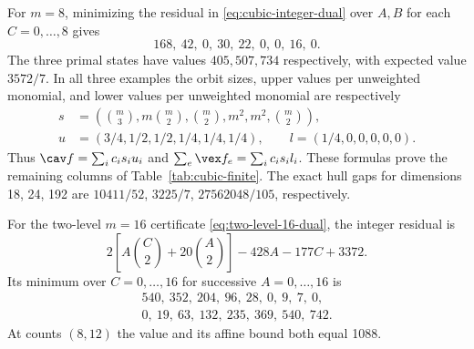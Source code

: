 For $m=8$, minimizing the residual in
\eqref{eq:cubic-integer-dual} over $A,B$ for each $C=0,\ldots,8$ gives
\[
 168,\ 42,\ 0,\ 30,\ 22,\ 0,\ 0,\ 16,\ 0.
\]
The three primal states have values $405,507,734$ respectively, with
expected value $3572/7$. In all three examples the orbit sizes, upper
values per unweighted monomial, and lower values per unweighted monomial
are respectively
\begin{align*}
 s&=\left(\binom m3,m\binom m2,\binom m2,m^2,m^2,\binom m2\right),\\
 u&=(3/4,1/2,1/2,1/4,1/4,1/4),\qquad
 l=(1/4,0,0,0,0,0).
\end{align*}
Thus $\cav f=\sum_ic_is_iu_i$ and $\sum_e\vex f_e=\sum_ic_is_il_i$.
These formulas prove the remaining columns of
Table~\ref{tab:cubic-finite}. The exact hull gaps for dimensions
18, 24, 192 are $10411/52$, $3225/7$, $27562048/105$, respectively.

For the two-level $m=16$ certificate
\eqref{eq:two-level-16-dual}, the integer residual is
\[
 2\left[A\binom C2+20\binom A2\right]-428A-177C+3372.
\]
Its minimum over $C=0,\ldots,16$ for successive $A=0,\ldots,16$ is
\[
\begin{gathered}
 540,\ 352,\ 204,\ 96,\ 28,\ 0,\ 9,\ 7,\ 0,\\
 0,\ 19,\ 63,\ 132,\ 235,\ 369,\ 540,\ 742.
\end{gathered}
\]
At counts $(8,12)$ the value and its affine bound both equal 1088.

